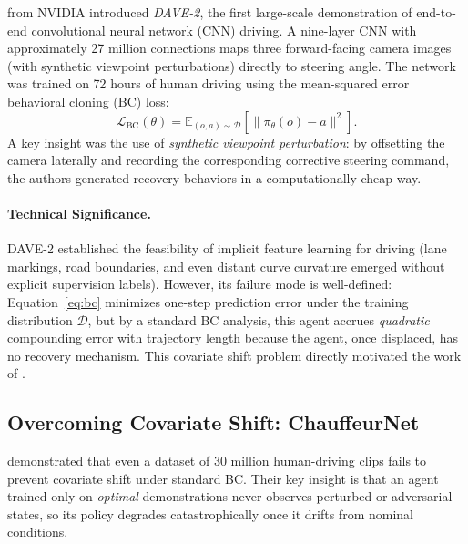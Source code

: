 \documentclass[12pt, a4paper]{article}
\begin{document}
\citet{bojarski2016end} from NVIDIA introduced \emph{DAVE-2}, the first large-scale
demonstration of end-to-end convolutional neural network (CNN) driving. A
nine-layer CNN with approximately 27 million connections maps three forward-facing
camera images (with synthetic viewpoint perturbations) directly to steering angle.
The network was trained on 72 hours of human driving using the mean-squared error
behavioral cloning (BC) loss:
\begin{equation}
  \mathcal{L}_{\text{BC}}(\theta) =
    \mathbb{E}_{(o, a) \sim \mathcal{D}}\!\left[ \|\pi_\theta(o) - a \|^2 \right].
  \label{eq:bc}
\end{equation}
A key insight was the use of \emph{synthetic viewpoint perturbation}: by
offsetting the camera laterally and recording the corresponding corrective steering
command, the authors generated recovery behaviors in a computationally cheap way.

\paragraph{Technical Significance.}
DAVE-2 established the feasibility of implicit feature learning for driving (lane
markings, road boundaries, and even distant curve curvature emerged without
explicit supervision labels). However, its failure mode is well-defined:
Equation~\eqref{eq:bc} minimizes one-step prediction error under the training
distribution $\mathcal{D}$, but by a standard BC analysis, this agent
accrues \emph{quadratic} compounding error with trajectory length because the
agent, once displaced, has no recovery mechanism. This covariate shift problem
directly motivated the work of \citet{bansal2018chauffeur}.

\subsection{Overcoming Covariate Shift: ChauffeurNet}
\label{sec:chauffeur}

\citet{bansal2018chauffeur} demonstrated that even a dataset of 30 million
human-driving clips fails to prevent covariate shift under standard BC. Their key
insight is that an agent trained only on \emph{optimal} demonstrations never
observes perturbed or adversarial states, so its policy degrades catastrophically
once it drifts from nominal conditions.
\end{document}
